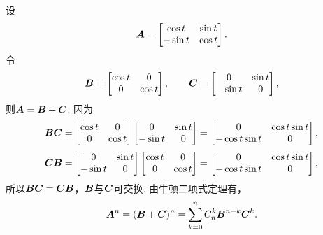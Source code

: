 \begin{example}
设\begin{equation*}
	\boldsymbol{A} = \begin{bmatrix}
	\cos t & \sin t \\
	-\sin t & \cos t
	\end{bmatrix}.
\end{equation*}
令\begin{equation*}
	\boldsymbol{B} = \begin{bmatrix}
		\cos t & 0 \\
		0 & \cos t
	\end{bmatrix},
	\qquad
	\boldsymbol{C} = \begin{bmatrix}
		0 & \sin t \\
		-\sin t & 0
	\end{bmatrix},
\end{equation*}
则\(\boldsymbol{A}=\boldsymbol{B}+\boldsymbol{C}\).
因为\begin{equation*}
	\boldsymbol{B}\boldsymbol{C} = \begin{bmatrix}
		\cos t & 0 \\
		0 & \cos t
	\end{bmatrix}
	\begin{bmatrix}
		0 & \sin t \\
		-\sin t & 0
	\end{bmatrix}
	= \begin{bmatrix}
		0 & \cos t \sin t \\
		-\cos t \sin t & 0
	\end{bmatrix},
\end{equation*}\begin{equation*}
	\boldsymbol{C}\boldsymbol{B} = \begin{bmatrix}
		0 & \sin t \\
		-\sin t & 0
	\end{bmatrix}
	\begin{bmatrix}
		\cos t & 0 \\
		0 & \cos t
	\end{bmatrix}
	= \begin{bmatrix}
		0 & \cos t \sin t \\
		-\cos t \sin t & 0
	\end{bmatrix},
\end{equation*}
所以\(\boldsymbol{B}\boldsymbol{C}=\boldsymbol{C}\boldsymbol{B}\)，\(\boldsymbol{B}\)与\(\boldsymbol{C}\)可交换.
由牛顿二项式定理有，\begin{equation*}
	\boldsymbol{A}^n=(\boldsymbol{B}+\boldsymbol{C})^n
	=\sum_{k=0}^n C_n^k \boldsymbol{B}^{n-k} \boldsymbol{C}^k.
\end{equation*}
\end{example}

